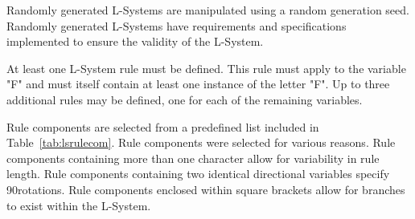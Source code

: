 Randomly generated L-Systems are manipulated using a random generation seed. Randomly generated L-Systems have requirements and specifications implemented to ensure the validity of the L-System.

At least one L-System rule must be defined. This rule must apply to the variable "F" and must itself contain at least one instance of the letter "F". Up to three additional rules may be defined, one for each of the remaining variables.

Rule components are selected from a predefined list included in Table~\ref{tab:lsrulecom}. Rule components were selected for various reasons. Rule components containing more than one character allow for variability in rule length. Rule components containing two identical directional variables specify 90\textdegree rotations. Rule components enclosed within square brackets allow for branches to exist within the L-System.

